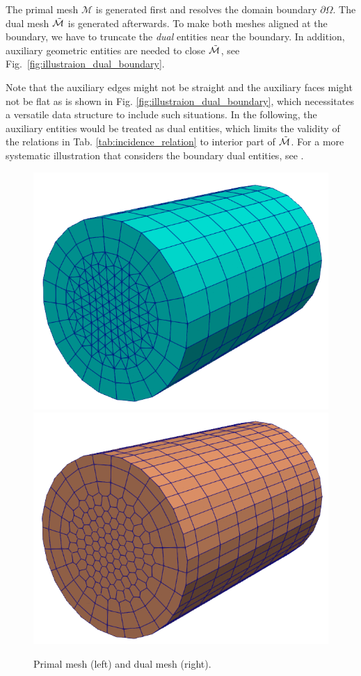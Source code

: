 \documentclass{article}
\begin{document}
The primal mesh $\mathcal{M}$ is generated first and resolves the domain boundary
$\partial\Omega$. The dual mesh $\Tilde{\mathcal{M}}$ is generated afterwards. To make
both meshes aligned at the boundary, we have to truncate the \emph{dual} entities near the
boundary. In addition, auxiliary geometric entities are needed to close
$\Tilde{\mathcal{M}}$, see Fig.~\ref{fig:illustraion_dual_boundary}.

Note that the auxiliary edges might not be straight and the auxiliary faces might not be
flat as is shown in Fig. \ref{fig:illustraion_dual_boundary}, which necessitates a
versatile data structure to include such situations. In the following, the auxiliary
entities would be treated as dual entities, which limits the validity of the relations in
Tab. \ref{tab:incidence_relation} to interior part of $\Tilde{\mathcal{M}}$. For a more
systematic illustration that considers the boundary dual entities, see
\cite[][Sec. 5]{hip_1999}.

\begin{figure}
    \centering
    \includegraphics[scale=0.3]{primal_mesh.png}
    \hspace{1cm}
    \includegraphics[scale=0.3]{dual_mesh.png}
    \caption{Primal mesh (left) and dual mesh (right).}
    \label{fig:primal_dual_meshes}
\end{figure}
\end{document}
